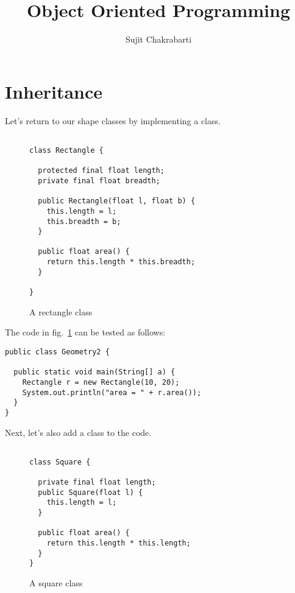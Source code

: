 \documentclass[12pt,a4paper]{article}
\author{Sujit Chakrabarti}
\title{Object Oriented Programming}
\date{}
\begin{document}

\newcommand{\highlight}[1]{{\color{Red}(#1)}}
\newcommand{\comment}[1]{{\color{Blue}#1}}


\maketitle

\section{Inheritance}
Let's return to our shape classes by implementing a \lstinline@Rectangle@ class.

\begin{figure}[H]
\begin{lstlisting}[frame=single]

class Rectangle {

  protected final float length;
  private final float breadth;

  public Rectangle(float l, float b) {
    this.length = l;
    this.breadth = b;
  }

  public float area() {
    return this.length * this.breadth;
  }

}
\end{lstlisting}
\caption{A rectangle class}
\label{f:rec1}
\end{figure}

The code in fig.~\ref{f:rec1} can be tested as follows:
\begin{lstlisting}[frame=single]
public class Geometry2 {

  public static void main(String[] a) {
    Rectangle r = new Rectangle(10, 20);
    System.out.println("area = " + r.area());
  }
}
\end{lstlisting}

Next, let's also add a \lstinline@Square@ class to the code.
\begin{figure}[H]
\begin{lstlisting}[frame=single]

class Square {

  private final float length;
  public Square(float l) {
    this.length = l;
  }

  public float area() {
    return this.length * this.length;
  }
}
\end{lstlisting}
\caption{A square class}
\label{f:sq1}
\end{figure}
\end{document}
